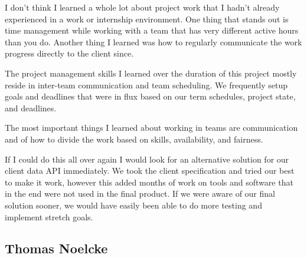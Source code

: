 \documentclass[onecolumn, draftclsnofoot,10pt, compsoc]{article}
\begin{document}
        I don't think I learned a whole lot about project work that I hadn't already experienced in a work or internship environment. One thing that stands out is time management while working with a team that has very different active hours than you do. Another thing I learned was how to regularly communicate the work progress directly to the client since.

        The project management skills I learned over the duration of this project mostly reside in inter-team communication and team scheduling. We frequently setup goals and deadlines that were in flux based on our term schedules, project state, and deadlines.

        The most important things I learned about working in teams are communication and of how to divide the work based on skills, availability, and fairness.

        If I could do this all over again I would look for an alternative solution for our client data API immediately. We took the client specification and tried our best to make it work, however this added months of work on tools and software that in the end were not used in the final product. If we were aware of our final solution sooner, we would have easily been able to do more testing and implement stretch goals.


    \subsection{Thomas Noelcke}
\end{document}
